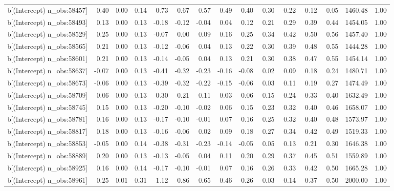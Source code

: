 \begin{table}[ht]
\begin{tabular}{rrrrrrrrrrrrrrr}
  b[(Intercept) n\_obs:58457] & -0.40 & 0.00 & 0.14 & -0.73 & -0.67 & -0.57 & -0.49 & -0.40 & -0.30 & -0.22 & -0.12 & -0.05 & 1460.48 & 1.00 \\ 
  b[(Intercept) n\_obs:58493] & 0.13 & 0.00 & 0.13 & -0.18 & -0.12 & -0.04 & 0.04 & 0.12 & 0.21 & 0.29 & 0.39 & 0.44 & 1454.05 & 1.00 \\ 
  b[(Intercept) n\_obs:58529] & 0.25 & 0.00 & 0.13 & -0.07 & 0.00 & 0.09 & 0.16 & 0.25 & 0.34 & 0.42 & 0.50 & 0.56 & 1457.40 & 1.00 \\ 
  b[(Intercept) n\_obs:58565] & 0.21 & 0.00 & 0.13 & -0.12 & -0.06 & 0.04 & 0.13 & 0.22 & 0.30 & 0.39 & 0.48 & 0.55 & 1444.28 & 1.00 \\ 
  b[(Intercept) n\_obs:58601] & 0.21 & 0.00 & 0.13 & -0.14 & -0.05 & 0.04 & 0.13 & 0.21 & 0.30 & 0.38 & 0.47 & 0.55 & 1454.14 & 1.00 \\ 
  b[(Intercept) n\_obs:58637] & -0.07 & 0.00 & 0.13 & -0.41 & -0.32 & -0.23 & -0.16 & -0.08 & 0.02 & 0.09 & 0.18 & 0.24 & 1480.71 & 1.00 \\ 
  b[(Intercept) n\_obs:58673] & -0.06 & 0.00 & 0.13 & -0.39 & -0.32 & -0.22 & -0.15 & -0.06 & 0.03 & 0.11 & 0.19 & 0.27 & 1474.49 & 1.00 \\ 
  b[(Intercept) n\_obs:58709] & 0.06 & 0.00 & 0.13 & -0.30 & -0.21 & -0.11 & -0.03 & 0.06 & 0.15 & 0.24 & 0.33 & 0.40 & 1632.49 & 1.00 \\ 
  b[(Intercept) n\_obs:58745] & 0.15 & 0.00 & 0.13 & -0.20 & -0.10 & -0.02 & 0.06 & 0.15 & 0.23 & 0.32 & 0.40 & 0.46 & 1658.07 & 1.00 \\ 
  b[(Intercept) n\_obs:58781] & 0.16 & 0.00 & 0.13 & -0.17 & -0.10 & -0.01 & 0.07 & 0.16 & 0.25 & 0.32 & 0.40 & 0.48 & 1573.97 & 1.00 \\ 
  b[(Intercept) n\_obs:58817] & 0.18 & 0.00 & 0.13 & -0.16 & -0.06 & 0.02 & 0.09 & 0.18 & 0.27 & 0.34 & 0.42 & 0.49 & 1519.33 & 1.00 \\ 
  b[(Intercept) n\_obs:58853] & -0.05 & 0.00 & 0.14 & -0.38 & -0.31 & -0.23 & -0.14 & -0.05 & 0.05 & 0.13 & 0.21 & 0.30 & 1646.38 & 1.00 \\ 
  b[(Intercept) n\_obs:58889] & 0.20 & 0.00 & 0.13 & -0.13 & -0.05 & 0.04 & 0.11 & 0.20 & 0.29 & 0.37 & 0.45 & 0.51 & 1559.89 & 1.00 \\ 
  b[(Intercept) n\_obs:58925] & 0.16 & 0.00 & 0.14 & -0.17 & -0.10 & -0.01 & 0.07 & 0.16 & 0.26 & 0.33 & 0.42 & 0.50 & 1665.28 & 1.00 \\ 
  b[(Intercept) n\_obs:58961] & -0.25 & 0.01 & 0.31 & -1.12 & -0.86 & -0.65 & -0.46 & -0.26 & -0.03 & 0.14 & 0.37 & 0.50 & 2000.00 & 1.00 \\ 

\end{tabular}
\end{table}
